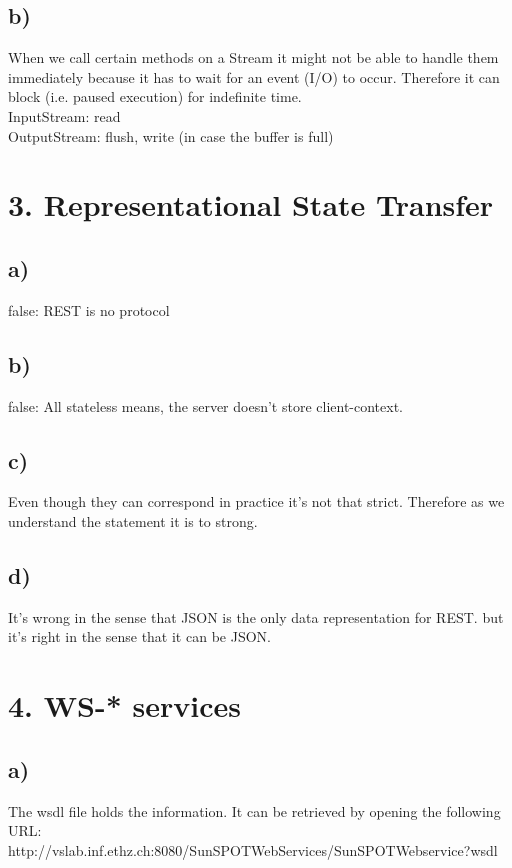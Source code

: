 \documentclass[10pt,a4paper]{article}
\begin{document}
		\subsection*{b)}
			When we call certain methods on a Stream it might not be able to handle them immediately because it has to wait for an event (I/O) to occur. Therefore it can block (i.e. paused execution) for indefinite time.\\
			InputStream: read\\
			OutputStream: flush, write (in case the buffer is full)\\
		
		
	\section*{3. Representational State Transfer}
		\subsection*{a)}
			false: REST is no protocol
		\subsection*{b)}
			false: All stateless means, the server doesn't store client-context.
		\subsection*{c)}
			Even though they can correspond in practice it's not that strict. Therefore as we understand the statement it is to strong.
		\subsection*{d)}
			It's wrong in the sense that JSON is the only data representation for REST. but it's right in the sense that it can be JSON.
		
	
	\section*{4. WS-* services}
		\subsection*{a)}
			The wsdl file holds the information. It can be retrieved by opening the following URL: \\
			http://vslab.inf.ethz.ch:8080/SunSPOTWebServices/SunSPOTWebservice?wsdl \\
			
\end{document}
